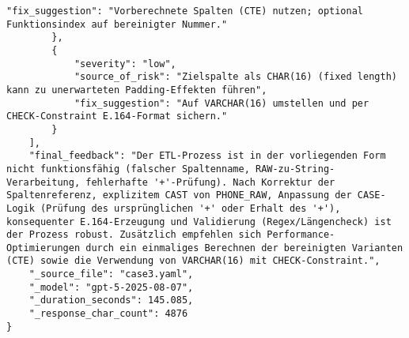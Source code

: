 \begin{lstlisting}[caption={Ausgabe: GPT-5 Anwendungsfall 3 Robustheitsdurchlauf},label={gpt_case3_prompt3}]
            "fix_suggestion": "Vorberechnete Spalten (CTE) nutzen; optional Funktionsindex auf bereinigter Nummer."
        },
        {
            "severity": "low",
            "source_of_risk": "Zielspalte als CHAR(16) (fixed length) kann zu unerwarteten Padding-Effekten führen",
            "fix_suggestion": "Auf VARCHAR(16) umstellen und per CHECK-Constraint E.164-Format sichern."
        }
    ],
    "final_feedback": "Der ETL-Prozess ist in der vorliegenden Form nicht funktionsfähig (falscher Spaltenname, RAW-zu-String-Verarbeitung, fehlerhafte '+'-Prüfung). Nach Korrektur der Spaltenreferenz, explizitem CAST von PHONE_RAW, Anpassung der CASE-Logik (Prüfung des ursprünglichen '+' oder Erhalt des '+'), konsequenter E.164-Erzeugung und Validierung (Regex/Längencheck) ist der Prozess robust. Zusätzlich empfehlen sich Performance-Optimierungen durch ein einmaliges Berechnen der bereinigten Varianten (CTE) sowie die Verwendung von VARCHAR(16) mit CHECK-Constraint.",
    "_source_file": "case3.yaml",
    "_model": "gpt-5-2025-08-07",
    "_duration_seconds": 145.085,
    "_response_char_count": 4876
}
\end{lstlisting}

